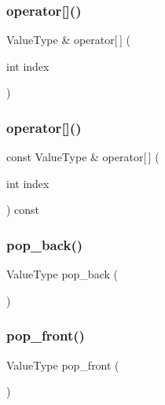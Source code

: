 \subsubsection{\texorpdfstring{operator[]()}{operator[]()}\hspace{0.1cm}{\footnotesize\ttfamily [1/2]}}
{\footnotesize\ttfamily Value\+Type \& operator\mbox{[}$\,$\mbox{]} (\begin{DoxyParamCaption}\item[{int}]{index }\end{DoxyParamCaption})}

\mbox{\label{classLinkedList_a1b5a4ea461655cbe512ab976aad8d809}} 
\subsubsection{\texorpdfstring{operator[]()}{operator[]()}\hspace{0.1cm}{\footnotesize\ttfamily [2/2]}}
{\footnotesize\ttfamily const Value\+Type \& operator\mbox{[}$\,$\mbox{]} (\begin{DoxyParamCaption}\item[{int}]{index }\end{DoxyParamCaption}) const}

\mbox{\label{classLinkedList_ab48f65e37130b674bc0f6220cbb59491}} 
\subsubsection{\texorpdfstring{pop\+\_\+back()}{pop\_back()}}
{\footnotesize\ttfamily Value\+Type pop\+\_\+back (\begin{DoxyParamCaption}{ }\end{DoxyParamCaption})}

\mbox{\label{classLinkedList_aacdba74afa1be07d1046ece9e0512c77}} 
\subsubsection{\texorpdfstring{pop\+\_\+front()}{pop\_front()}}
{\footnotesize\ttfamily Value\+Type pop\+\_\+front (\begin{DoxyParamCaption}{ }\end{DoxyParamCaption})}

